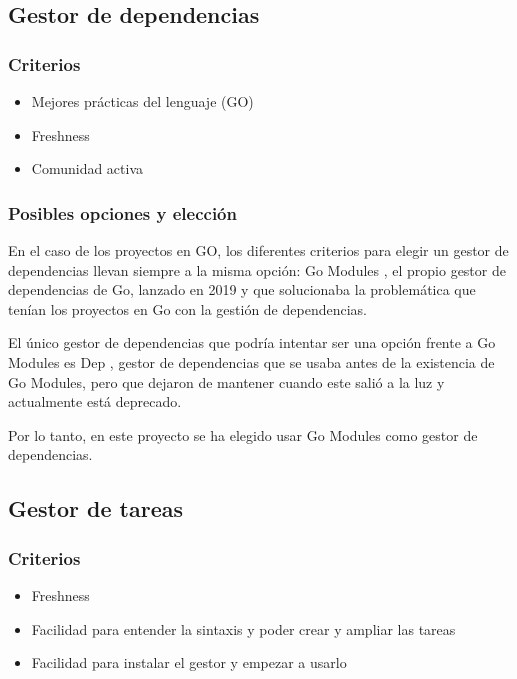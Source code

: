 \newpage

\subsection{Gestor de dependencias}
\subsubsection{Criterios}

\begin{itemize}
\item
  Mejores prácticas del lenguaje (GO)
\item
  Freshness
\item
  Comunidad activa
\end{itemize}

\subsubsection{Posibles opciones y elección}

En el caso de los proyectos en GO, los diferentes criterios para elegir
un gestor de dependencias llevan siempre a la misma opción:
Go Modules \cite{go-modules}, el propio
gestor de dependencias de Go, lanzado en 2019 y que solucionaba la
problemática que tenían los proyectos en Go con la gestión de
dependencias.

El único gestor de dependencias que podría intentar ser una opción
frente a Go Modules es Dep \cite{dep}, gestor
de dependencias que se usaba antes de la existencia de Go Modules, pero
que dejaron de mantener cuando este salió a la luz y actualmente está
deprecado.

Por lo tanto, en este proyecto se ha elegido usar Go Modules como gestor
de dependencias.

\newpage
\subsection{Gestor de tareas}
\subsubsection{Criterios}\label{criterios}

\begin{itemize}
\item
  Freshness
\item
  Facilidad para entender la sintaxis y poder crear y ampliar las tareas
\item
  Facilidad para instalar el gestor y empezar a usarlo
\end{itemize}

